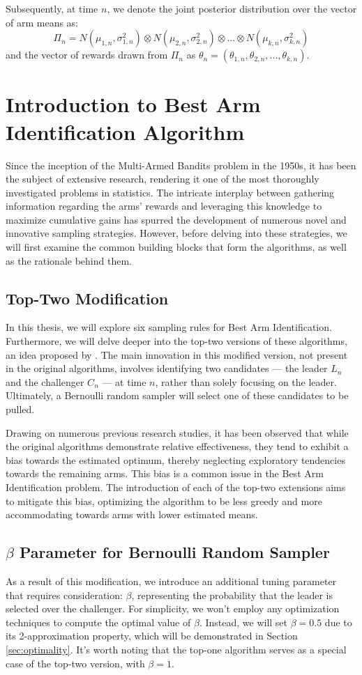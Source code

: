 \documentclass[a4paper, 12pt]{article}
\theoremstyle{definition}
\begin{document}
Subsequently, at time $n$, we denote the joint posterior distribution over the vector of arm means as:
\[\Pi_n = N(\mu_{1,n},\sigma_{1,n}^2) \otimes N(\mu_{2,n},\sigma_{2,n}^2) \otimes ... \otimes N(\mu_{k,n},\sigma_{k,n}^2)\]
and the vector of rewards drawn from $\Pi_n$ as $\theta_n = (\theta_{1,n},\theta_{2,n}, ..., \theta_{k,n})$.



\section{Introduction to Best Arm Identification Algorithm} \label{sec:algo_intro}
Since the inception of the Multi-Armed Bandits problem in the 1950s, it has been the subject of extensive research, rendering it one of the most thoroughly investigated problems in statistics. The intricate interplay between gathering information regarding the arms' rewards and leveraging this knowledge to maximize cumulative gains has spurred the development of numerous novel and innovative sampling strategies. However, before delving into these strategies, we will first examine the common building blocks that form the algorithms, as well as the rationale behind them.


\subsection{Top-Two Modification} 
In this thesis, we will explore six sampling rules for Best Arm Identification. Furthermore, we will delve deeper into the top-two versions of these algorithms, an idea proposed by \cite{toptwo}. The main innovation in this modified version, not present in the original algorithms, involves identifying two candidates — the leader $L_n$ and the challenger $C_n$ — at time $n$, rather than solely focusing on the leader. Ultimately, a Bernoulli random sampler will select one of these candidates to be pulled.

Drawing on numerous previous research studies, it has been observed that while the original algorithms demonstrate relative effectiveness, they tend to exhibit a bias towards the estimated optimum, thereby neglecting exploratory tendencies towards the remaining arms. This bias is a common issue in the Best Arm Identification problem. The introduction of each of the top-two extensions aims to mitigate this bias, optimizing the algorithm to be less greedy and more accommodating towards arms with lower estimated means.


\subsection{$\beta$ Parameter for Bernoulli Random Sampler}
As a result of this modification, we introduce an additional tuning parameter that requires consideration: $\beta$, representing the probability that the leader is selected over the challenger. For simplicity, we won't employ any optimization techniques to compute the optimal value of $\beta$. Instead, we will set $\beta = 0.5$ due to its 2-approximation property, which will be demonstrated in Section \ref{sec:optimality}. It's worth noting that the top-one algorithm serves as a special case of the top-two version, with $\beta = 1$.
\end{document}
